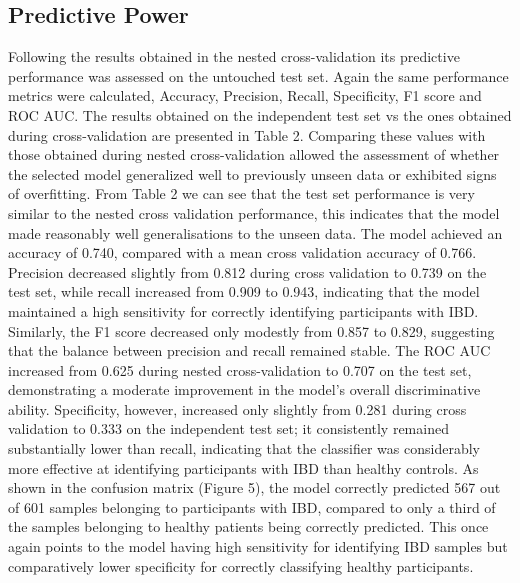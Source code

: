 \documentclass[twoside,twocolumn,10pt]{article}
\begin{document}
\subsection{Predictive Power}
Following the results obtained in the nested cross-validation its predictive performance was assessed on the untouched test set. Again the same performance metrics were calculated, Accuracy, Precision, Recall, Specificity, F1 score and ROC AUC. The results obtained on the independent test set vs the ones obtained during cross-validation are presented in Table 2. Comparing these values with those obtained during nested cross-validation allowed the assessment of whether the selected model generalized well to previously unseen data or exhibited signs of overfitting.
From Table 2 we can see that the test set performance is very similar to the nested cross validation performance, this indicates that the model made reasonably well generalisations to the unseen data. The model achieved an accuracy of 0.740, compared with a mean cross validation accuracy of 0.766. Precision decreased slightly from 0.812 during cross validation to 0.739 on the test set, while recall increased from 0.909 to 0.943, indicating that the model maintained a high sensitivity for correctly identifying participants with IBD. Similarly, the F1 score decreased only modestly from 0.857 to 0.829, suggesting that the balance between precision and recall remained stable. The ROC AUC increased from 0.625 during nested cross-validation to 0.707 on the test set, demonstrating a moderate improvement in the model's overall discriminative ability. Specificity, however, increased only slightly from 0.281 during cross validation to 0.333 on the independent test set; it consistently remained substantially lower than recall, indicating that the classifier was considerably more effective at identifying participants with IBD than healthy controls.
As shown in the confusion matrix (Figure 5), the model correctly predicted 567 out of 601 samples belonging to participants with IBD, compared to only a third of the samples belonging to healthy patients being correctly predicted. This once again points to the model having high sensitivity for identifying IBD samples but comparatively lower specificity for correctly classifying healthy participants.
\end{document}
